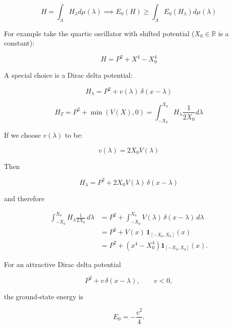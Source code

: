\documentclass{article}
\theoremstyle{definition}
\begin{document}
\begin{equation}
    H=\int_\Lambda H_\lambda d\mu(\lambda)
    \implies
    E_0(H) \ge \int_\Lambda E_0(H_\lambda) d\mu(\lambda)
\end{equation}

For example take the quartic oscillator with shifted potential ($X_0\in\mathbb{R}$ is a constant):

\begin{equation}
    H=P^2 + X^4-X_0^4
\end{equation}

A special choice is a Dirac delta potential:

\begin{equation}
    H_\lambda=P^2+v(\lambda) \ \delta(x-\lambda)
\end{equation}

\begin{equation}
    H_{T} = P^2 + \min(V(X),0)
    =
    \int_{-X_0}^{X_0} H_\lambda \frac{1}{2 X_0} d\lambda
\end{equation}

If we choose $v(\lambda)$ to be:

\begin{equation}
    v(\lambda) = 2 X_0 V(\lambda)
\end{equation}

Then

\begin{equation}
    H_{\lambda}
    =
    P^2
    +
    2X_0 V(\lambda)\,\delta(x-\lambda)
\end{equation}

and therefore

\begin{align}
    \int_{-X_0}^{X_0}
    H_{\lambda}\frac{1}{2X_0}\,d\lambda
    &=
    P^2
    +
    \int_{-X_0}^{X_0}
    V(\lambda)\,\delta(x-\lambda)\,d\lambda
    \\
    &=
    P^2
    +
    V(x)\,\mathbf{1}_{[-X_0,X_0]}(x)
    \\
    &=
    P^2
    +
    \left(x^4-X_0^4\right)
    \mathbf{1}_{[-X_0,X_0]}(x).
\end{align}

For an attractive Dirac delta potential

\begin{equation}
    P^2+v\,\delta(x-\lambda),
    \qquad v<0,
\end{equation}

the ground-state energy is

\begin{equation}
    E_0
    =
    -\frac{v^2}{4}.
\end{equation}
\end{document}
